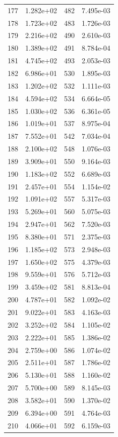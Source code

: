 \documentclass[12pt]{article}
\begin{document}
\begin{longtable}{@{}cccc@{}}
177 & 1.282e+02 & 482 & 7.495e-03 \\
178 & 1.723e+02 & 483 & 1.726e-03 \\
179 & 2.216e+02 & 490 & 2.610e-03 \\
180 & 1.389e+02 & 491 & 8.784e-04 \\
181 & 4.745e+02 & 493 & 2.053e-03 \\
182 & 6.986e+01 & 530 & 1.895e-03 \\
183 & 1.202e+02 & 532 & 1.111e-03 \\
184 & 4.594e+02 & 534 & 6.664e-05 \\
185 & 1.030e+02 & 536 & 6.361e-05 \\
186 & 1.019e+01 & 537 & 8.975e-04 \\
187 & 7.552e+01 & 542 & 7.034e-04 \\
188 & 2.100e+02 & 548 & 1.076e-03 \\
189 & 3.909e+01 & 550 & 9.164e-03 \\
190 & 1.183e+02 & 552 & 6.689e-03 \\
191 & 2.457e+01 & 554 & 1.154e-02 \\
192 & 1.091e+02 & 557 & 5.317e-03 \\
193 & 5.269e+01 & 560 & 5.075e-03 \\
194 & 2.947e+01 & 562 & 7.520e-03 \\
195 & 8.380e+01 & 571 & 2.375e-03 \\
196 & 1.185e+02 & 573 & 2.948e-03 \\
197 & 1.650e+02 & 575 & 4.379e-03 \\
198 & 9.559e+01 & 576 & 5.712e-03 \\
199 & 3.459e+02 & 581 & 8.813e-04 \\
200 & 4.787e+01 & 582 & 1.092e-02 \\
201 & 9.022e+01 & 583 & 4.163e-03 \\
202 & 3.252e+02 & 584 & 1.105e-02 \\
203 & 2.222e+01 & 585 & 1.386e-02 \\
204 & 2.759e+00 & 586 & 1.074e-02 \\
205 & 2.511e+01 & 587 & 1.786e-02 \\
206 & 5.130e+01 & 588 & 1.160e-02 \\
207 & 5.700e+00 & 589 & 8.145e-03 \\
208 & 3.582e+01 & 590 & 1.370e-02 \\
209 & 6.394e+00 & 591 & 4.764e-03 \\
210 & 4.066e+01 & 592 & 6.159e-03 \\

\end{longtable}
\end{document}
